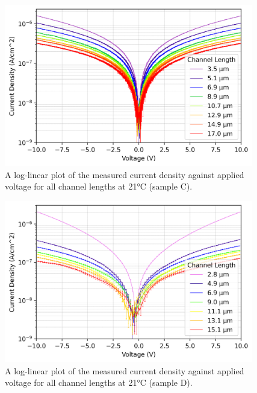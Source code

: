 \begin{figure}[h]
    \centering
    \includegraphics[width=0.97\textwidth]{Sample C 2019/10V_Current_Density_vs_Voltage_Temperature_21_log.png}
    \caption{A log-linear plot of the measured current density against applied voltage for all channel lengths at 21\si{\degreeCelsius} (sample C).}
    \label{fig:10V_current_density_21_C}
\end{figure}
\begin{figure}[h]
    \centering
    \includegraphics[width=0.97\textwidth]{Sample D 2019/10V_Current_Density_vs_Voltage_Temperature_21_log.png}
    \caption{A log-linear plot of the measured current density against applied voltage for all channel lengths at 21\si{\degreeCelsius} (sample D).}
    \label{fig:10V__current_density_21_D}
\end{figure}

